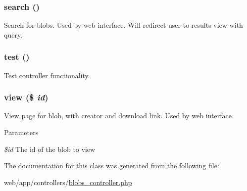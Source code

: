 \hypertarget{class_blobs_controller_a796bf438724e047aeef18579732a3780}{
\subsubsection[{search}]{\setlength{\rightskip}{0pt plus 5cm}search ()}}
\label{class_blobs_controller_a796bf438724e047aeef18579732a3780}
Search for blobs. Used by web interface. Will redirect user to results view with query. \hypertarget{class_blobs_controller_ad69dd4607977cae05ebe19d1ae604fb1}{
\subsubsection[{test}]{\setlength{\rightskip}{0pt plus 5cm}test ()}}
\label{class_blobs_controller_ad69dd4607977cae05ebe19d1ae604fb1}
Test controller functionality. \hypertarget{class_blobs_controller_a93a99cdd06e6a3044ed7e56db0f9419a}{
\subsubsection[{view}]{\setlength{\rightskip}{0pt plus 5cm}view (\$ {\em id})}}
\label{class_blobs_controller_a93a99cdd06e6a3044ed7e56db0f9419a}
View page for blob, with creator and download link. Used by web interface. 
\begin{DoxyParams}{Parameters}
\item[{\em \$id}]The id of the blob to view \end{DoxyParams}


The documentation for this class was generated from the following file:\begin{DoxyCompactItemize}
\item 
web/app/controllers/\hyperlink{blobs__controller_8php}{blobs\_\-controller.php}\end{DoxyCompactItemize}

